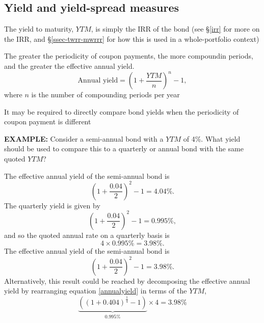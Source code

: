 \documentclass[../notes_compiled.tex]{subfiles}
\begin{document}
\subsection{Yield and yield-spread measures}
\begin{itemize}
\item The yield to maturity, $YTM$, is simply the IRR of the bond (see \S\ref{irr} for more on the IRR, and \S\ref{ssec-twrr-mwrrr} for how this is used in a whole-portfolio context)
\item The greater the periodicity of coupon payments, the more compoundin periods, and the greater the effective annual yield.
\begin{equation}
\text{Annual yield} = \left(1+\frac{YTM}{n}\right)^{n}-1, \label{annualyield}
\end{equation}
where $n$ is the number of compounding periods per year
\item It may be required to directly compare bond yields when the periodicity of coupon payment is different
{\color{RedViolet}
\item[] \textbf{EXAMPLE:} Consider a semi-annual bond with a $YTM$ of 4\%. What yield should be used to compare this to a quarterly or annual bond with the same quoted $YTM$?
}
{\color{RoyalBlue}
The effective annual yield of the semi-annual bond is
\begin{equation*}
\left( 1 + \frac{0.04}{2}\right)^{2} -1 = 4.04\%.
\end{equation*}
The quarterly yield is given by
\begin{equation*}
\left( 1 + \frac{0.04}{2}\right)^{2} -1 = 0.995\%,
\end{equation*}
and so the quoted annual rate on a quarterly basis is
\begin{equation*}
4\times 0.995\%= 3.98\%.
\end{equation*}
The effective annual yield of the semi-annual bond is
\begin{equation*}
\left( 1 + \frac{0.04}{2}\right)^{2} -1 = 3.98\%.
\end{equation*}
Alternatively, this result could be reached by decomposing the effective annual yield by rearranging equation \ref{annualyield} in terms of the $YTM$,
\begin{equation*}
\underbrace{\left(\left(1+0.404\right)^{\frac{1}{4}}-1\right)}_{0.995\%}\times4 = 3.98\%
\end{equation*}
}
\end{itemize}
\end{document}
